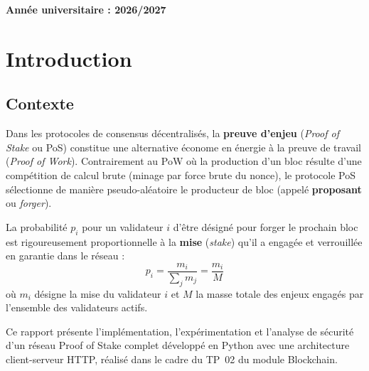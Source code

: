 \documentclass[11pt,a4paper]{article}
\begin{document}
\begin{titlepage}
    \vfill

    \begin{center}
        \textbf{Année universitaire : 2026/2027}
    \end{center}
\end{titlepage}

\newpage
{}
\tableofcontents
\newpage
{}


\section{Introduction}

\subsection{Contexte}
Dans les protocoles de consensus décentralisés, la \textbf{preuve d'enjeu} (\emph{Proof of Stake} ou PoS) constitue une alternative économe en énergie à la preuve de travail (\emph{Proof of Work}). Contrairement au PoW où la production d'un bloc résulte d'une compétition de calcul brute (minage par force brute du nonce), le protocole PoS sélectionne de manière pseudo-aléatoire le producteur de bloc (appelé \textbf{proposant} ou \emph{forger}).

La probabilité $p_i$ pour un validateur $i$ d'être désigné pour forger le prochain bloc est rigoureusement proportionnelle à la \textbf{mise} (\emph{stake}) qu'il a engagée et verrouillée en garantie dans le réseau :
\[
p_i = \frac{m_i}{\sum_{j} m_j} = \frac{m_i}{M}
\]
où $m_i$ désigne la mise du validateur $i$ et $M$ la masse totale des enjeux engagés par l'ensemble des validateurs actifs. 

Ce rapport présente l'implémentation, l'expérimentation et l'analyse de sécurité d'un réseau Proof of Stake complet développé en Python avec une architecture client-serveur HTTP, réalisé dans le cadre du TP~02 du module Blockchain.
\end{document}
